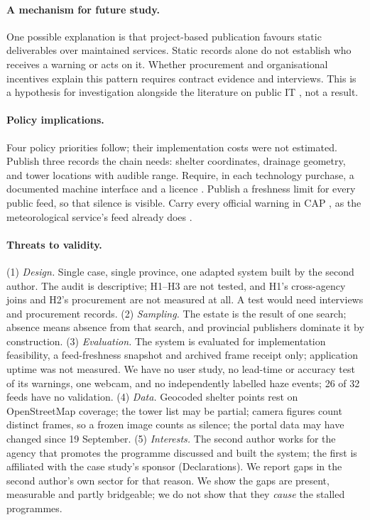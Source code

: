 \documentclass[10pt,twocolumn,a4paper]{article}
\begin{document}
\paragraph{A mechanism for future study.} One possible explanation is that project-based publication favours static deliverables over maintained services. Static records alone do not establish who receives a warning or acts on it. Whether procurement and organisational incentives explain this pattern requires contract evidence and interviews. This is a hypothesis for investigation alongside the literature on public IT \citep{goldfinch2007,heeks2006,pahlka2023}, not a result.

\paragraph{Policy implications.} Four policy priorities follow; their implementation costs were not estimated. Publish three records the chain needs: shelter coordinates, drainage geometry, and tower locations with audible range. Require, in each technology purchase, a documented machine interface and a licence \citep{edler2007,mergel2019}. Publish a freshness limit for every public feed, so that silence is visible. Carry every official warning in CAP \citep{oasis2010cap}, as the meteorological service\textquoteright s feed already does \citep{tmd2026cap}.

\paragraph{Threats to validity.}\label{sec:limits} (1) \emph{Design.} Single case, single province, one adapted system built by the second author. The audit is descriptive; H1--H3 are not tested, and H1\textquoteright s cross-agency joins and H2\textquoteright s procurement are not measured at all. A test would need interviews and procurement records. (2) \emph{Sampling.} The estate is the result of one search; absence means absence from that search, and provincial publishers dominate it by construction. (3) \emph{Evaluation.} The system is evaluated for implementation feasibility, a feed-freshness snapshot and archived frame receipt only; application uptime was not measured. We have no user study, no lead-time or accuracy test of its warnings, one webcam, and no independently labelled haze events; 26 of 32 feeds have no validation. (4) \emph{Data.} Geocoded shelter points rest on OpenStreetMap coverage; the tower list may be partial; camera figures count distinct frames, so a frozen image counts as silence; the portal data may have changed since 19 September. (5) \emph{Interests.} The second author works for the agency that promotes the programme discussed and built the system; the first is affiliated with the case study\textquoteright s sponsor (Declarations). We report gaps in the second author\textquoteright s own sector for that reason. We show the gaps are present, measurable and partly bridgeable; we do not show that they \emph{cause} the stalled programmes.
\end{document}
